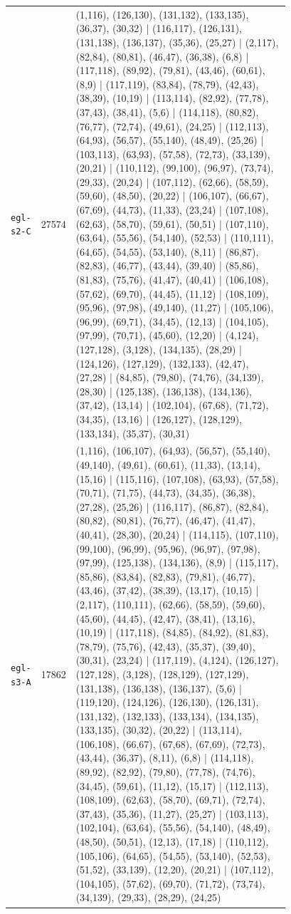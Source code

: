 \begin{landscape}
\begin{longtable}{lr>{\tiny\raggedright\arraybackslash}p{0.78\linewidth}}
\texttt{egl-s2-C} & 27574 & (1,116), (126,130), (131,132), (133,135), (36,37), (30,32) | (116,117), (126,131), (131,138), (136,137), (35,36), (25,27) | (2,117), (82,84), (80,81), (46,47), (36,38), (6,8) | (117,118), (89,92), (79,81), (43,46), (60,61), (8,9) | (117,119), (83,84), (78,79), (42,43), (38,39), (10,19) | (113,114), (82,92), (77,78), (37,43), (38,41), (5,6) | (114,118), (80,82), (76,77), (72,74), (49,61), (24,25) | (112,113), (64,93), (56,57), (55,140), (48,49), (25,26) | (103,113), (63,93), (57,58), (72,73), (33,139), (20,21) | (110,112), (99,100), (96,97), (73,74), (29,33), (20,24) | (107,112), (62,66), (58,59), (59,60), (48,50), (20,22) | (106,107), (66,67), (67,69), (44,73), (11,33), (23,24) | (107,108), (62,63), (58,70), (59,61), (50,51) | (107,110), (63,64), (55,56), (54,140), (52,53) | (110,111), (64,65), (54,55), (53,140), (8,11) | (86,87), (82,83), (46,77), (43,44), (39,40) | (85,86), (81,83), (75,76), (41,47), (40,41) | (106,108), (57,62), (69,70), (44,45), (11,12) | (108,109), (95,96), (97,98), (49,140), (11,27) | (105,106), (96,99), (69,71), (34,45), (12,13) | (104,105), (97,99), (70,71), (45,60), (12,20) | (4,124), (127,128), (3,128), (134,135), (28,29) | (124,126), (127,129), (132,133), (42,47), (27,28) | (84,85), (79,80), (74,76), (34,139), (28,30) | (125,138), (136,138), (134,136), (37,42), (13,14) | (102,104), (67,68), (71,72), (34,35), (13,16) | (126,127), (128,129), (133,134), (35,37), (30,31) \\[2pt]
\texttt{egl-s3-A} & 17862 & (1,116), (106,107), (64,93), (56,57), (55,140), (49,140), (49,61), (60,61), (11,33), (13,14), (15,16) | (115,116), (107,108), (63,93), (57,58), (70,71), (71,75), (44,73), (34,35), (36,38), (27,28), (25,26) | (116,117), (86,87), (82,84), (80,82), (80,81), (76,77), (46,47), (41,47), (40,41), (28,30), (20,24) | (114,115), (107,110), (99,100), (96,99), (95,96), (96,97), (97,98), (97,99), (125,138), (134,136), (8,9) | (115,117), (85,86), (83,84), (82,83), (79,81), (46,77), (43,46), (37,42), (38,39), (13,17), (10,15) | (2,117), (110,111), (62,66), (58,59), (59,60), (45,60), (44,45), (42,47), (38,41), (13,16), (10,19) | (117,118), (84,85), (84,92), (81,83), (78,79), (75,76), (42,43), (35,37), (39,40), (30,31), (23,24) | (117,119), (4,124), (126,127), (127,128), (3,128), (128,129), (127,129), (131,138), (136,138), (136,137), (5,6) | (119,120), (124,126), (126,130), (126,131), (131,132), (132,133), (133,134), (134,135), (133,135), (30,32), (20,22) | (113,114), (106,108), (66,67), (67,68), (67,69), (72,73), (43,44), (36,37), (8,11), (6,8) | (114,118), (89,92), (82,92), (79,80), (77,78), (74,76), (34,45), (59,61), (11,12), (15,17) | (112,113), (108,109), (62,63), (58,70), (69,71), (72,74), (37,43), (35,36), (11,27), (25,27) | (103,113), (102,104), (63,64), (55,56), (54,140), (48,49), (48,50), (50,51), (12,13), (17,18) | (110,112), (105,106), (64,65), (54,55), (53,140), (52,53), (51,52), (33,139), (12,20), (20,21) | (107,112), (104,105), (57,62), (69,70), (71,72), (73,74), (34,139), (29,33), (28,29), (24,25) \\[2pt]

\end{longtable}
\end{landscape}
